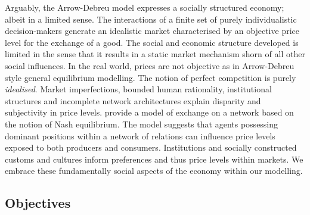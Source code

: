 
Arguably, the Arrow-Debreu model expresses a socially structured economy; albeit in a limited sense. The interactions of a finite set of purely individualistic decision-makers generate an idealistic market characterised by an objective price level for the exchange of a good. The social and economic structure developed is limited in the sense that it results in a static market mechanism shorn of all other social influences. In the real world, prices are not objective as in Arrow-Debreu style general equilibrium modelling. The notion of perfect competition is purely \emph{idealised}. Market imperfections, bounded human rationality, institutional structures and incomplete network architectures explain disparity and subjectivity in price levels. \citet{Blume2009} provide a model of exchange on a network based on the notion of Nash equilibrium. The model suggests that agents possessing dominant positions within a network of relations can influence price levels exposed to both producers and consumers. Institutions and socially constructed customs and cultures inform preferences and thus price levels within markets. We embrace these fundamentally social aspects of the economy within our modelling.

\subsection{Objectives}

